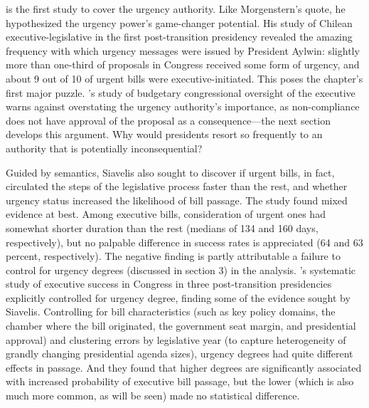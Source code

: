 \documentclass[letter,12pt]{article}
\begin{document}
\citet{siavelis.2002} is the first study to cover the urgency authority. Like Morgenstern's quote, he hypothesized the urgency power's game-changer potential. His study of Chilean executive-legislative in the first post-transition presidency revealed the amazing frequency with which urgency messages were issued by President Aylwin: slightly more than one-third of proposals in Congress received some form of urgency, and about 9 out of 10 of urgent bills were executive-initiated. This poses the chapter's first major puzzle. \citeauthor{berrios.gamboa.fiscChile.2006}'s \citeyearpar{berrios.gamboa.fiscChile.2006} study of budgetary congressional oversight of the executive warns against overstating the urgency authority's importance, as non-compliance does not have approval of the proposal as a consequence---the next section develops this argument. Why would presidents resort so frequently to an authority that is potentially inconsequential?

Guided by semantics, Siavelis also sought to discover if urgent bills, in fact, circulated the steps of the legislative process faster than the rest, and whether urgency status increased the likelihood of bill passage. The study found mixed evidence at best. Among executive bills, consideration of urgent ones had somewhat shorter duration than the rest (medians of 134 and 160 days, respectively), but no palpable difference in success rates is appreciated (64 and 63 percent, respectively). The negative finding is partly attributable a failure to control for urgency degrees (discussed in section 3) in the analysis. \citeauthor{aleman.navia.UrgChi.2009}'s \citeyearpar{aleman.navia.UrgChi.2009} systematic study of executive success in Congress in three post-transition presidencies explicitly controlled for urgency degree, finding some of the evidence sought by Siavelis. Controlling for bill characteristics (such as key policy domains, the chamber where the bill originated, the government seat margin, and presidential approval) and clustering errors by legislative year (to capture heterogeneity of grandly changing presidential agenda sizes), urgency degrees had quite different effects in passage. And they found that higher degrees are significantly associated with increased probability of executive bill passage, but the lower (which is also much more common, as will be seen) made no statistical difference. 
\end{document}
